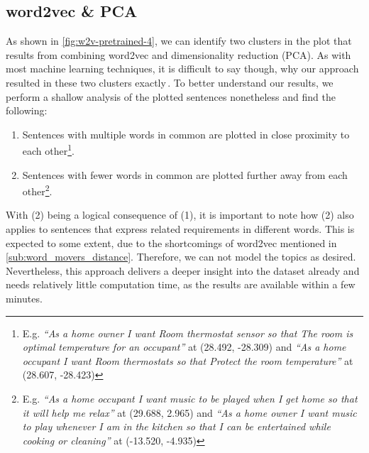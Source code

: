 \subsection{word2vec \& PCA} %
\label{sub:findings_w2v}
As shown in \autoref{fig:w2v-pretrained-4}, we can identify two clusters in the plot that results from combining word2vec and dimensionality reduction (PCA). As with most machine learning techniques, it is difficult to say though, why our approach resulted in these two clusters exactly\,\cite{ribeiro_why_2016}. To better understand our results, we perform a shallow analysis of the plotted sentences nonetheless and find the following:
\begin{enumerate}
  \item Sentences with multiple words in common are plotted in close proximity to each other\footnote{E.g. \textit{``As a home owner I want Room thermostat sensor so that The room is optimal temperature for an occupant''} at (28.492, -28.309) and \textit{``As a home occupant I want Room thermostats so that Protect the room temperature''} at (28.607, -28.423)}.
  \item Sentences with fewer words in common are plotted further away from each other\footnote{E.g. \textit{``As a home occupant I want music to be played when I get home so that it will help me relax''} at (29.688, 2.965) and \textit{``As a home owner I want music to play whenever I am in the kitchen so that I can be entertained while cooking or cleaning''} at (-13.520, -4.935)}.
\end{enumerate}
With (2) being a logical consequence of (1), it is important to note how (2) also applies to sentences that express related requirements in different words. This is expected to some extent, due to the shortcomings of word2vec mentioned in \autoref{sub:word_movers_distance}. Therefore, we can not model the topics as desired. Nevertheless, this approach delivers a deeper insight into the dataset already and needs relatively little computation time, as the results are available within a few minutes.

